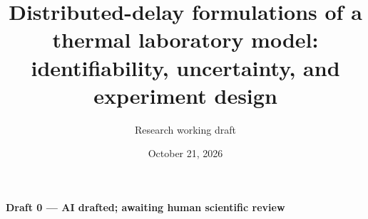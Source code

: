 \documentclass[11pt]{article}
\title{Distributed-delay formulations of a thermal laboratory model:\\
identifiability, uncertainty, and experiment design}
\author{Research working draft}
\date{October 21, 2026}
\newcommand{\draftstatus}{Draft 0 --- AI drafted; awaiting human scientific review}
\begin{document}
\maketitle
\begin{center}\small\textbf{\draftstatus}\end{center}
\begin{abstract}

\end{abstract}








\appendix





\clearpage

\end{document}
